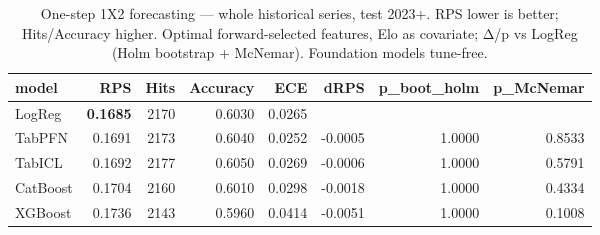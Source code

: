 \begin{table}[t]
  \centering
  \caption{One-step 1X2 forecasting — whole historical series, test 2023+. RPS lower is better; Hits/Accuracy higher. Optimal forward-selected features, Elo as covariate; Δ/p vs LogReg (Holm bootstrap + McNemar). Foundation models tune-free.}
  \label{tab:onestep_series}
  \begin{tabular}{lrrrrrrr}
  \toprule
  model & RPS & Hits & Accuracy & ECE & dRPS & p\_boot\_holm & p\_McNemar \\
  \midrule
  LogReg & \textbf{0.1685} & 2170 & 0.6030 & 0.0265 &  &  &  \\
  TabPFN & 0.1691 & 2173 & 0.6040 & 0.0252 & -0.0005 & 1.0000 & 0.8533 \\
  TabICL & 0.1692 & 2177 & 0.6050 & 0.0269 & -0.0006 & 1.0000 & 0.5791 \\
  CatBoost & 0.1704 & 2160 & 0.6010 & 0.0298 & -0.0018 & 1.0000 & 0.4334 \\
  XGBoost & 0.1736 & 2143 & 0.5960 & 0.0414 & -0.0051 & 1.0000 & 0.1008 \\
  \bottomrule
  \end{tabular}
\end{table}
